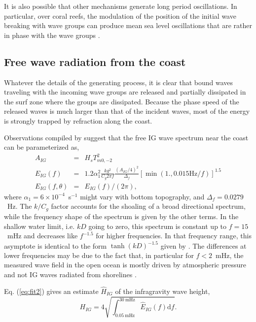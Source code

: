 It is also possible that other mechanisms generate long period oscillations. In particular, over coral reefs, the modulation of the position of the initial wave breaking with wave groups 
can produce mean sea level oscillations that are rather in phase with the wave groups \citep{Symonds&al.1982}. 

\subsection{Free wave radiation from the coast}
Whatever the details of the generating process, it is clear that bound waves traveling with the incoming wave groups are released and partially dissipated in the 
surf zone where the groups are dissipated. Because the phase speed of the released waves is much larger than that of the incident waves, 
most of the energy is strongly trapped by refraction along the coast. 

Observations compiled by \cite{Ardhuin&al.2014} suggest that the free IG wave spectrum near the coast can be parameterized as, 
\begin{eqnarray}
 A_{IG} & =&    H_s T_{m0,-2}^2\label{eq:fit0} \\
{E}_{IG}(f)& = & 1.2 \alpha_1^2 \frac{k g^2}{C_g 2 \pi f} \frac{(A_{IG}/4)^2}{\Delta_f}   \left[\min( 1., 0.015\mathrm{Hz}/ f)\right]^{1.5} \label{eq:fit1} \\
{E}_{IG}(f,\theta) & = & {E}_{IG}(f) / (2 \pi ),
\label{eq:fit2} 
\end{eqnarray}
where $\alpha_1=6 \times 10^{-4}$~s$^{-1}$ might vary with bottom topography, and $\Delta_f = 0.0279$~Hz. 
The $k/C_g$ factor accounts for the shoaling of a broad directional spectrum, while the frequency shape of the spectrum
is given by the other terms. In the shallow water limit, i.e. $k D$ going to zero, this spectrum is constant up to $f=15$~mHz and 
decreases like $f^{-1.5}$ for higher frequencies. In that frequency range, this asymptote is identical to the form $\tanh(kD)^{-1.5}$ given by 
\cite{Godin&al.2013}. The differences at lower frequencies may be due to the fact that, in particular for $f < 2$~mHz, the measured wave 
field in the open ocean is mostly driven by atmospheric pressure and not IG waves radiated from shorelines \citep{Filloux1980,deJong&al.2003}.

Eq. (\ref{eq:fit2}) gives an estimate $\widehat{H}_{IG}$ of the infragravity wave height, 
\begin{equation}
H_{IG}   =  4 \sqrt{\int_{0.05~\mathrm{mHz}}^{30~\mathrm{mHz}} \widehat{E}_{IG}(f)\mathrm{d} f}.  \label{eq:fit3}  
\end{equation}



